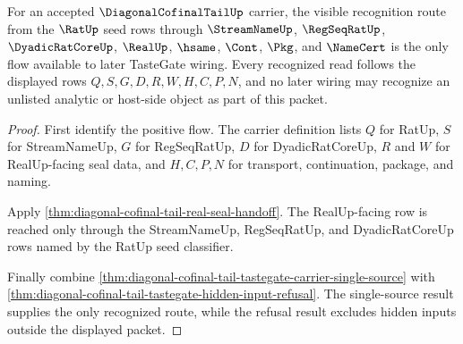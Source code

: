 \begin{theorem}
\label{thm:diagonal-cofinal-tail-tastegate-flow-recognition}
For an accepted $\DiagonalCofinalTailUp$ carrier, the visible recognition route from the $\RatUp$ seed rows through $\StreamNameUp$, $\RegSeqRatUp$, $\DyadicRatCoreUp$, $\RealUp$, $\hsame$, $\Cont$, $\Pkg$, and $\NameCert$ is the only flow available to later TasteGate wiring. Every recognized read follows the displayed rows $Q,S,G,D,R,W,H,C,P,N$, and no later wiring may recognize an unlisted analytic or host-side object as part of this packet.
\end{theorem}
\begin{proof}
First identify the positive flow. The carrier definition lists $Q$ for RatUp, $S$ for StreamNameUp, $G$ for RegSeqRatUp, $D$ for DyadicRatCoreUp, $R$ and $W$ for RealUp-facing seal data, and $H,C,P,N$ for transport, continuation, package, and naming.

Apply \autoref{thm:diagonal-cofinal-tail-real-seal-handoff}. The RealUp-facing row is reached only through the StreamNameUp, RegSeqRatUp, and DyadicRatCoreUp rows named by the RatUp seed classifier.

Finally combine \autoref{thm:diagonal-cofinal-tail-tastegate-carrier-single-source} with \autoref{thm:diagonal-cofinal-tail-tastegate-hidden-input-refusal}. The single-source result supplies the only recognized route, while the refusal result excludes hidden inputs outside the displayed packet.
\end{proof}

